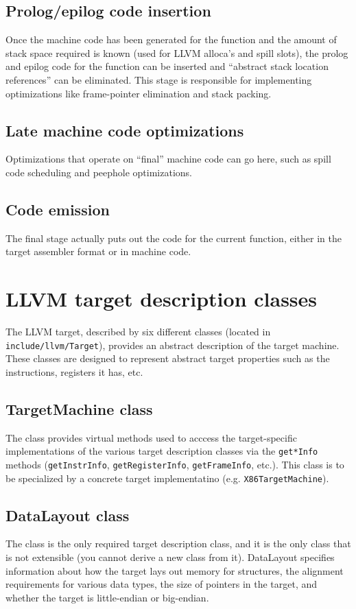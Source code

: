 \documentclass{myproc}
\begin{document}
\subsection{Prolog/epilog code insertion} Once the machine code has been
generated for the function and the amount of stack space required is known
(used for LLVM alloca’s and spill slots), the prolog and epilog code for the
function can be inserted and “abstract stack location references” can be
eliminated. This stage is responsible for implementing optimizations like
frame-pointer elimination and stack packing.

\subsection{Late machine code optimizations} Optimizations that operate on
``final'' machine code can go here, such as spill code scheduling and peephole
optimizations.

\subsection{Code emission} The final stage actually puts out the code for the
current function, either in the target assembler format or in machine code.

\section{LLVM target description classes}
The LLVM target, described by six different classes (located in
\verb+include/llvm/Target+), provides an abstract description of the target
machine. These classes are designed to represent abstract target properties
such as the instructions, registers it has, etc. 

\subsection{TargetMachine class}
The  class provides virtual methods used to acccess the
target-specific implementations of the various target description classes via
the \verb+get*Info+ methods (\verb+getInstrInfo+, \verb+getRegisterInfo+,
\verb+getFrameInfo+, etc.). This class is to be specialized by a concrete
target implementatino (e.g. \verb+X86TargetMachine+). 

\subsection{DataLayout class}
The  class is the only required target description class, and
it is the only class that is not extensible (you cannot derive a new class
from it). DataLayout specifies information about how the target lays out
memory for structures, the alignment requirements for various data types, the
size of pointers in the target, and whether the target is little-endian or
big-endian. 
\end{document}
